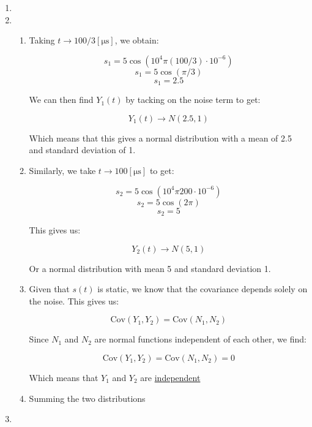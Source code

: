 \begin{enumerate}

  \item

  \item

    \begin{enumerate}

      \item Taking $t\to100/3[\si{\micro\second}]$, we obtain:

        $$s_1=5\cos(10^4\pi (100/3)\cdot10^{-6})$$
        $$s_1=5\cos(\pi/3)$$
        $$s_1=2.5$$

        We can then find $Y_1(t)$ by tacking on the noise term to get:

        $$\boxed{Y_1(t)\to N(2.5,1)}$$

        Which means that this gives a normal distribution with a mean of 2.5 and standard deviation of 1.

      \item Similarly, we take $t\to100[\si{\micro\second}]$ to get:

        $$s_2=5\cos(10^4\pi 200\cdot10^{-6})$$
        $$s_2=5\cos(2\pi)$$
        $$s_2=5$$

        This gives us:

        $$\boxed{Y_2(t)\to N(5,1)}$$

        Or a normal distribution with mean 5 and standard deviation 1.

      \item Given that $s(t)$ is static, we know that the covariance depends solely on the noise. This gives us:

        $$\text{Cov}(Y_1,Y_2)=\text{Cov}(N_1,N_2)$$

        Since $N_1$ and $N_2$ are normal functions independent of each other, we find:

        $$\text{Cov}(Y_1,Y_2)=\text{Cov}(N_1,N_2)=0$$

        Which means that $Y_1$ and $Y_2$ are \underline{independent}

      \item Summing the two distributions 

    \end{enumerate}

    \setcounter{enumi}{3}

  \item

    \begin{enumerate}


\end{enumerate}
\end{enumerate}

